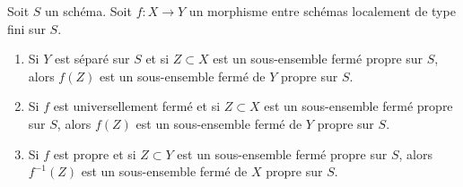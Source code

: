 \begin{lemma}
\label{lemma-functoriality-closed-proper-over-base}
Soit $S$ un schéma. Soit $f : X \to Y$ un morphisme entre schémas
localement de type fini sur $S$.
\begin{enumerate}
\item Si $Y$ est séparé sur $S$ et si $Z \subset X$ est un sous-ensemble fermé
propre sur $S$, alors $f(Z)$ est un sous-ensemble fermé de $Y$ propre sur $S$.
\item Si $f$ est universellement fermé et si $Z \subset X$ est un
sous-ensemble fermé propre sur $S$, alors $f(Z)$ est un sous-ensemble fermé
de $Y$ propre sur $S$.
\item Si $f$ est propre et si $Z \subset Y$ est un sous-ensemble fermé
propre sur $S$, alors $f^{-1}(Z)$ est un sous-ensemble fermé de $X$ propre sur $S$.
\end{enumerate}
\end{lemma}

